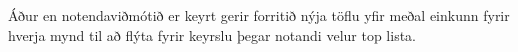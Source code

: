 Áður en notendaviðmótið er keyrt gerir forritið nýja töflu yfir meðal einkunn fyrir hverja mynd til að flýta fyrir keyrslu þegar notandi velur top lista.
